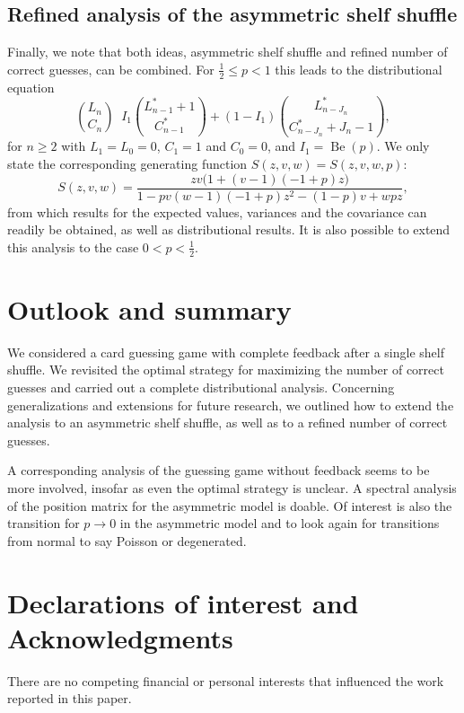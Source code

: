 \documentclass[10pt,reqno,a4paper]{amsart}
\theoremstyle{definition}
\DeclareMathOperator{\law}{\overset{\mathcal{L}}{=}}
\DeclareMathOperator{\Be}{Be}
\newcommand{\veca}[2]{\ensuremath{\binom{#1}{#2}}}
\begin{document}
\subsection{Refined analysis of the asymmetric shelf shuffle}
Finally, we note that both ideas, asymmetric shelf shuffle and refined number of correct guesses, can be combined. 
For $\frac12\le p<1$ this leads to the distributional equation
\begin{equation}
\label{eqn:DistNew2}
\veca{L_n}{C_n} \law I_1 \veca{L^{\ast}_{n-1}+1}{C^{\ast}_{n-1}} +(1-I_1)\veca{L^{\ast}_{n-J_n}}{C^{\ast}_{n-J_n}+J_n-1}, 
\end{equation}
for $n\ge 2$ with $L_1=L_0=0$, $C_1=1$ and $C_0=0$, and $I_1=\Be(p)$. We only state the corresponding generating function
$S(z,v,w)=S(z,v,w,p)$:
\[
S(z,v,w)=\frac{zv\big(1 + (v - 1)(-1 + p)z\big)}{1 - pv(w - 1)(-1 + p)z^2 - (1 - p)v + wpz},
\]
from which results for the expected values, variances and the covariance can readily be obtained, as well as distributional results. It is also possible to extend this analysis to the case $0<p<\frac12$.

\section{Outlook and summary}
We considered a card guessing game with complete feedback after a single shelf shuffle. We revisited the optimal strategy for maximizing the number of correct guesses and carried out a complete distributional analysis. Concerning generalizations and extensions for future research, 
we outlined how to extend the analysis to an asymmetric shelf shuffle, as well as to a refined number of correct guesses. 

\smallskip 

A corresponding analysis of the guessing game without feedback
seems to be more involved, insofar as even the optimal strategy is unclear. A spectral analysis of the position matrix for the asymmetric model is doable. Of interest is also the transition for $p\to 0$ in the asymmetric model and to look again for transitions from normal to say Poisson or degenerated. 


\section*{Declarations of interest and Acknowledgments}
There are no competing financial or personal interests that influenced the work reported in this paper. 


{}

\end{document}
